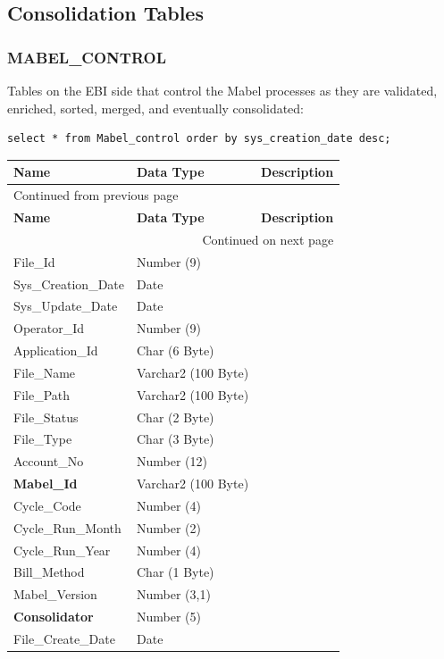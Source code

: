 \documentclass[12pt,twoside]{article}
\begin{document}
\subsection{Consolidation Tables}
\label{sec:orgheadline154}
\subsubsection{MABEL\_CONTROL}
\label{sec:orgheadline146}
Tables on the EBI side that control the Mabel processes as they are validated, enriched, sorted, merged, and eventually consolidated:
\begin{verbatim}
select * from Mabel_control order by sys_creation_date desc;
\end{verbatim}
\footnotesize
\begin{longtable}{l|l|l}
\hline
\textbf{Name} & \textbf{Data Type} & \textbf{Description}\\
\hline
\endfirsthead
\multicolumn{3}{l}{Continued from previous page} \\
\hline

\textbf{Name} & \textbf{Data Type} & \textbf{Description} \\

\hline
\endhead
\hline\multicolumn{3}{r}{Continued on next page} \\
\endfoot
\endlastfoot
\hline
File\_Id & Number (9) & \\
Sys\_Creation\_Date & Date & \\
Sys\_Update\_Date & Date & \\
Operator\_Id & Number (9) & \\
Application\_Id & Char (6 Byte) & \\
File\_Name & Varchar2 (100 Byte) & \\
File\_Path & Varchar2 (100 Byte) & \\
File\_Status & Char (2 Byte) & \\
File\_Type & Char (3 Byte) & \\
Account\_No & Number (12) & \\
\textbf{Mabel\_Id} & Varchar2 (100 Byte) & \\
Cycle\_Code & Number (4) & \\
Cycle\_Run\_Month & Number (2) & \\
Cycle\_Run\_Year & Number (4) & \\
Bill\_Method & Char (1 Byte) & \\
Mabel\_Version & Number (3,1) & \\
\textbf{Consolidator} & Number (5) & \\
File\_Create\_Date & Date & \\
\hline
\end{longtable}
\end{document}
